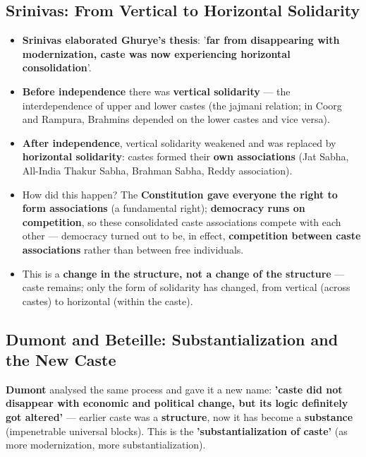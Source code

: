 \subsection{Srinivas: From Vertical to Horizontal Solidarity}

\begin{KeyConcept}
\begin{itemize}
\item \textbf{Srinivas elaborated Ghurye's thesis}: '\textbf{far from disappearing with modernization, caste was now experiencing horizontal consolidation}'.
\item \textbf{Before independence} there was \textbf{vertical solidarity} --- the interdependence of upper and lower castes (the jajmani relation; in Coorg and Rampura, Brahmins depended on the lower castes and vice versa).
\item \textbf{After independence}, vertical solidarity weakened and was replaced by \textbf{horizontal solidarity}: castes formed their \textbf{own associations} (Jat Sabha, All-India Thakur Sabha, Brahman Sabha, Reddy association).
\item How did this happen? The \textbf{Constitution gave everyone the right to form associations} (a fundamental right); \textbf{democracy runs on competition}, so these consolidated caste associations compete with each other --- democracy turned out to be, in effect, \textbf{competition between caste associations} rather than between free individuals.
\item This is a \textbf{change in the structure, not a change of the structure} --- caste remains; only the form of solidarity has changed, from vertical (across castes) to horizontal (within the caste).
\end{itemize}
\end{KeyConcept}

\subsection{Dumont and Beteille: Substantialization and the New Caste}

\begin{KeyConcept}
\textbf{Dumont} analysed the same process and gave it a new name: \textbf{'caste did not disappear with economic and political change, but its logic definitely got altered'} --- earlier caste was a \textbf{structure}, now it has become a \textbf{substance} (impenetrable universal blocks). This is the \textbf{'substantialization of caste'} (as more modernization, more substantialization).
\end{KeyConcept}

